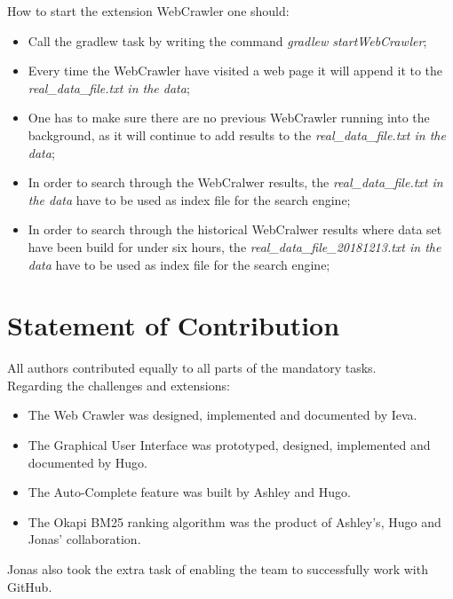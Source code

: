 How to start the extension WebCrawler one should:
\begin{itemize}
    \item Call the gradlew task by writing the command  \textit{gradlew startWebCrawler};
    \item Every time the WebCrawler have visited a web page it will append it to the \textit{real\_data\_file.txt in the data};
    \item One has to make sure there are no previous WebCrawler running into the background, as it will continue to add results to the \textit{real\_data\_file.txt in the data};
    \item In order to search through the WebCralwer results, the \textit{real\_data\_file.txt in the data} have to be used as index file for the search engine;
    \item In order to search through the historical WebCralwer results where data set have been build for under six hours, the \textit{real\_data\_file\_20181213.txt in the data} have to be used as index file for the search engine;
\end{itemize}

\section{Statement of Contribution}
\label{sec:Statement of Contribution}
All authors contributed equally to all parts of the mandatory tasks.\\
Regarding the challenges and extensions:
\begin{itemize}
    \item The Web Crawler was designed, implemented and documented by Ieva.
    \item The Graphical User Interface was prototyped, designed, implemented and documented by Hugo.
    \item The Auto-Complete feature was built by Ashley and Hugo.
    \item The Okapi BM25 ranking algorithm was the product of Ashley's, Hugo and Jonas' collaboration.
\end{itemize}
Jonas also took the extra task of enabling the team to successfully work with GitHub.